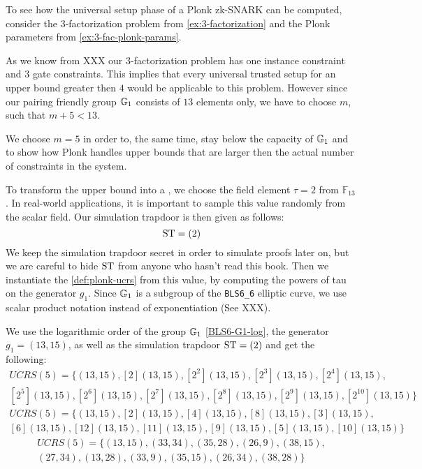 \begin{example}
\label{ex:3-fac-UCRS}
To see how the universal setup phase of a Plonk zk-SNARK can be computed, consider the $3$-factorization problem from \ref{ex:3-factorization} and the Plonk parameters from \examplename{} \ref{ex:3-fac-plonk-params}. 

As we know from XXX our $3$-factorization problem has one instance constraint and $3$ gate constraints. This implies that every universal trusted setup for an upper bound greater then $4$ would be applicable to this problem. However since our pairing friendly group $\mathbb{G}_1$ consists of $13$ elements only, we have to choose $m$, such that $m+5<13$. 

We choose $m=5$ in order to, the same time, stay below the capacity of $\mathbb{G}_1$ and to show how Plonk handles upper bounds that are larger then the actual number of constraints in the system.

To transform the upper bound into a , we choose the  field element $\tau=2$ from $\mathbb{F}_{13}$. In real-world applications, it is important to sample this value randomly from the scalar field. Our simulation trapdoor is then given as follows:
$$
\mathrm{ST} = (2)
$$
We keep the simulation trapdoor secret in order to simulate proofs later on, but we are careful to hide $\mathrm{ST}$ from anyone who hasn't read this book. Then we instantiate the  \ref{def:plonk-ucrs} from this value, by computing the powers of tau on the generator $g_1$. Since $\mathbb{G}_1$ is a subgroup of the \texttt{BLS6\_6} elliptic curve, we use scalar product notation instead of exponentiation (See XXX). 

We use the logarithmic order of the group $\mathbb{G}_1$ \ref{BLS6-G1-log}, the generator $g_1=(13,15)$, as well as the simulation trapdoor $\mathrm{ST} =(2)$ and get the following:
\begin{multline*}
UCRS(5) =\{(13,15), [2](13,15), [2^2](13,15), [2^3](13,15), [2^4](13,15), \\
[2^5](13,15), [2^6](13,15), [2^7](13,15), [2^8](13,15), [2^9](13,15), [2^{10}](13,15)\}
\end{multline*}
\begin{multline*}
UCRS(5) =\{(13,15), [2](13,15), [4](13,15), [8](13,15), [3](13,15), \\
[6](13,15), [12](13,15), [11](13,15), [9](13,15), [5](13,15), [10](13,15)\}
\end{multline*}
\begin{multline*}
UCRS(5) =\{(13,15), (33,34), (35,28), (26,9), (38,15), \\
(27,34), (13,28), (33,9), (35,15), (26,34), (38,28)\}
\end{multline*}


\end{example}
